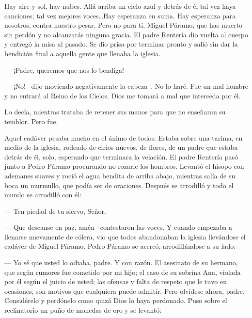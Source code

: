 
\begin{pages}
	\begin{Leftside}
		\beginnumbering

			\guillemotleft Hay aire y sol, hay nubes. Allá arriba un cielo azul y detrás de él tal vez haya canciones; tal vez mejores voces\ldots Hay esperanza en suma. Hay esperanza para nosotros, contra nuestro pesar.
		\pend
		\pstart
			\guillemotright Pero no para ti, Miguel Páramo, que has muerto sin perdón y no alcanzarás ninguna gracia.\guillemotright
		\pend
		\pstart
			El padre Rentería dio vuelta al cuerpo y entregó la misa al pasado. Se dio prisa por terminar pronto y salió sin dar la bendición final a aquella gente que llenaba la iglesia.

			--- ¡Padre, queremos que nos lo bendiga!

			--- ¡No! --dijo moviendo negativamente la cabeza--. No lo haré. Fue un mal hombre y no entrará al Reino de los Cielos. Dios me tomará a mal que interceda por él.

		\pend
		\pstart
			Lo decía, mientras trataba de retener sus manos para que no enseñaran su temblor. Pero fue.

		\pend
		\pstart
			Aquel cadáver pesaba mucho en el ánimo de todos. Estaba sobre una tarima, en medio de la iglesia, rodeado de cirios nuevos, de flores, de un padre que estaba detrás de él, solo, esperando que terminara la velación.
		\pend
		\pstart
			El padre Rentería pasó junto a Pedro Páramo procurando no rozarle los hombros. Levantó el hisopo con ademanes suaves y roció el agua bendita de arriba abajo, mientras salía de su boca un murmullo, que podía ser de oraciones. Después se arrodilló y todo el mundo se arrodilló con él:

			--- Ten piedad de tu siervo, Señor.

			--- Que descanse en paz, amén --contestaron las voces.
		\pend
		\pstart
			Y cuando empezaba a llenarse nuevamente de cólera, vio que todos abandonaban la iglesia llevándose el cadáver de Miguel Páramo.
		\pend
		\pstart
			Pedro Páramo se acercó, arrodillándose a su lado:

			--- Yo sé que usted lo odiaba, padre. Y con razón. El asesinato de su hermano, que según rumores fue cometido por mi hijo; el caso de su sobrina Ana, violada por él según el juicio de usted; las ofensas y falta de respeto que le tuvo en ocasiones, son motivos que cualquiera puede admitir. Pero olvídese ahora, padre. Considérelo y perdónelo como quizá Dios lo haya perdonado.
		\pend
		\pstart
			Puso sobre el reclinatorio un puño de monedas de oro y se levantó:


\end{Leftside}
\end{pages}
